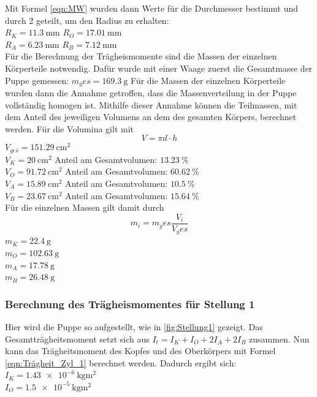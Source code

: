     Mit Formel \ref{eqn:MW} wurden dann Werte für die Durchmesser bestimmt und durch 2 geteilt, um den Radius zu erhalten:\\
    $R_K=\qty{11.3}{\milli\meter}$ \quad
    $R_O=\qty{17.01}{\milli\meter}$\\
    $R_A=\qty{6.23}{\milli\meter}$ \quad
    $R_B=\qty{7.12}{\milli\meter}$\\

    Für die Berechnung der Trägheismomente sind die Massen der einzelnen Körperteile notwendig.
    Dafür wurde mit einer Waage zuerst die Gesamtmasse der Puppe gemessen: $m_ges=\qty{169.3}{\gram}$
    Für die Massen der einzelnen Körperteile wurden dann die Annahme getroffen, dass die Massenverteilung in der Puppe vollständig homogen ist.
    Mithilfe dieser Annahme können die Teilmassen, mit dem Anteil des jeweiligen Volumens an dem des gesamten Körpers, berechnet werden.
    Für die Volumina gilt mit 
    \begin{equation}
      V=\pi d\cdot h
      \label{eqn:volumen}
    \end{equation}
    $V_{ges}=\qty{151.29}{\centi\meter\squared}$\\
    $V_K=\qty{20}{\centi\meter\squared}$ Anteil am Gesamtvolumen: $\qty{13.23}{\percent}$\\
    $V_O=\qty{91.72}{\centi\meter\squared}$ Anteil am Gesamtvolumen: $\qty{60.62}{\percent}$\\
    $V_A=\qty{15.89}{\centi\meter\squared}$ Anteil am Gesamtvolumen: $\qty{10.5}{\percent}$\\
    $V_B=\qty{23.67}{\centi\meter\squared}$ Anteil am Gesamtvolumen: $\qty{15.64}{\percent}$\\

    Für die einzelnen Massen gilt damit durch 
    \begin{equation}
      m_i=m_ges \frac{V_i}{V_ges}
    \end{equation}
    $m_K=\qty{22.4}{\gram}$\\
    $m_O=\qty{102.63}{\gram}$\\
    $m_A=\qty{17.78}{\gram}$\\
    $m_B=\qty{26.48}{\gram}$\\

    \subsubsection{Berechnung des Trägheismomentes für Stellung 1}
    Hier wird die Puppe so aufgestellt, wie in \ref{fig:Stellung1} gezeigt.%
    Das Gesamtträgheitsmoment setzt sich aus $I_{t}=I_K+I_O+2I_A+2I_B$ zusammen.
    Nun kann das Trägheitsmoment des Kopfes und des Oberkörpers mit Formel \ref{eqn:Trägheit_Zyl_1} berechnet werden.
    Dadurch ergibt sich:\\
    $I_K=\qty{1.43e-6}{\kilo\gram\meter\squared}$\\
    $I_O=\qty{1.5e-5}{\kilo\gram\meter\squared}$\\
    
